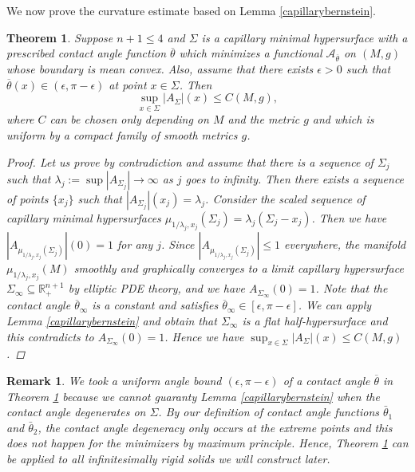 \documentclass[11pt,letterpaper]{amsart}
\newtheorem{rem}{Remark}[section]
\newtheorem{thm}[problem]{Theorem}
\begin{document}
We now prove the curvature estimate based on Lemma \ref{capillarybernstein}.
\begin{thm} \label{thm : curv estimate} Suppose $n+1 \le 4$ and $\Sigma$ is a capillary minimal hypersurface with a prescribed contact angle function $\overline{\theta}$ which minimizes a functional $\mathcal{A}_{\overline{\theta}}$ on $(M,g)$ whose boundary is mean convex. Also, assume that there exists $\epsilon>0$ such that $\overline{\theta}(x) \in (\epsilon, \pi - \epsilon)$ at point $x \in \Sigma$. Then
\begin{equation*}
    \sup_{x \in \Sigma} |A_{\Sigma}|(x) \le C(M,g),
\end{equation*}
where $C$ can be chosen only depending on $M$ and the metric $g$ and which is uniform by a compact family of smooth metrics $g$.
\begin{proof} Let us prove by contradiction and assume that there is a sequence of $\Sigma_{j}$ such that $\lambda_{j} :=  \sup |A_{\Sigma_{j}}| \rightarrow \infty$ as $j$ goes to infinity. Then there exists a sequence of points $\{ x_{j} \}$ such that $|A_{\Sigma_{j}}|(x_{j}) = \lambda_{j}$. Consider the scaled sequence of capillary minimal hypersurfaces $\mu_{1/\lambda_{j},x_{j}}(\Sigma_{j}) = \lambda_{j} (\Sigma_{j}- x_{j})$. Then we have $|A_{\mu_{1/\lambda_{j},x_{j}}(\Sigma_{j})}|(0) = 1$ for any $j$. Since $|A_{\mu_{1/\lambda_{j},x_{j}}(\Sigma_{j})}| \le 1$ everywhere, the manifold $\mu_{1/\lambda_{j},x_{j}}(M)$ smoothly and graphically converges to a limit capillary hypersurface $\Sigma_{\infty} \subseteq \mathbb{R}^{n+1}_{+}$ by elliptic PDE theory, and we have $A_{\Sigma_{\infty}} (0)=1$. Note that the contact angle $\overline{\theta}_{\infty}$ is a constant and satisfies $\overline{\theta}_{\infty} \in [\epsilon, \pi- \epsilon]$. We can apply Lemma \ref{capillarybernstein} and obtain that $\Sigma_{\infty}$ is a flat half-hypersurface and this contradicts to $A_{\Sigma_{\infty}} (0)=1$. Hence we have $\sup_{x \in \Sigma} |A_{\Sigma}|(x) \le C(M,g)$.
\end{proof}
\end{thm}
\begin{rem}
    We took a uniform angle bound $(\epsilon, \pi-\epsilon)$ of a contact angle $\overline{\theta}$ in Theorem \ref{thm : curv estimate} because we cannot guaranty Lemma \ref{capillarybernstein} when the contact angle degenerates on $\Sigma$. By our definition of contact angle functions $\bar{\theta}_{1}$ and $\bar{\theta}_{2}$, the contact angle degeneracy only occurs at the extreme points and this does not happen for the minimizers by maximum principle. Hence, Theorem \ref{thm : curv estimate} can be applied to all infinitesimally rigid solids we will construct later.
\end{rem}
\end{document}
